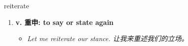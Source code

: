 
\begin{frame}
{\huge reiterate}
\begin{center}
\begin{enumerate}\Large
  \item \textbf{v. 重申: to say or state again}
  \begin{itemize}
    \item \em{\Large{Let me reiterate our stance. 让我来重述我们的立场。}}
  \end{itemize}
\end{enumerate}
\end{center}
\end{frame}
